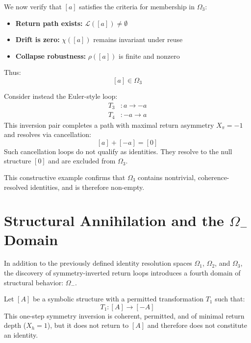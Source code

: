 \begin{definition} \label{def:omega3-verification}
We now verify that $[a]$ satisfies the criteria for membership in $\Omega_3$:
\begin{itemize}
  \item \textbf{Return path exists:} $\mathcal{L}([a]) \neq \emptyset$
  \item \textbf{Drift is zero:} $\chi([a])$ remains invariant under reuse
  \item \textbf{Collapse robustness:} $\rho([a])$ is finite and nonzero
\end{itemize}
Thus:
\begin{equation} \label{eq:a-in-omega3}
[a] \in \Omega_3
\end{equation}
\end{definition}

\begin{definition} \label{def:euler-inversion-exclusion}
Consider instead the Euler-style loop:
\begin{align}
T_3 &: a \rightarrow -a \label{eq:rule-t3} \\
T_4 &: -a \rightarrow a \label{eq:rule-t4}
\end{align}
This inversion pair completes a path with maximal return asymmetry $X_\pi = -1$ and resolves via cancellation:
\begin{equation} \label{eq:euler-cancellation-example}
[a] + [-a] = [0]
\end{equation}
Such cancellation loops do not qualify as identities. They resolve to the null structure $[0]$ and are excluded from $\Omega_3$.
\end{definition}

This constructive example confirms that $\Omega_3$ contains nontrivial, coherence-resolved identities, and is therefore non-empty.

\section{Structural Annihilation and the $\Omega_-$ Domain}

In addition to the previously defined identity resolution spaces $\Omega_1$, $\Omega_2$, and $\Omega_3$, the discovery of symmetry-inverted return loops introduces a fourth domain of structural behavior: $\Omega_-$.

\begin{definition} \label{def:symmetry-inversion}
Let $[A]$ be a symbolic structure with a permitted transformation $T_1$ such that:
\begin{equation} \label{eq:symmetry-inversion}
T_1 : [A] \rightarrow [-A]
\end{equation}
This one-step symmetry inversion is coherent, permitted, and of minimal return depth ($X_h = 1$), but it does not return to $[A]$ and therefore does not constitute an identity.
\end{definition}

